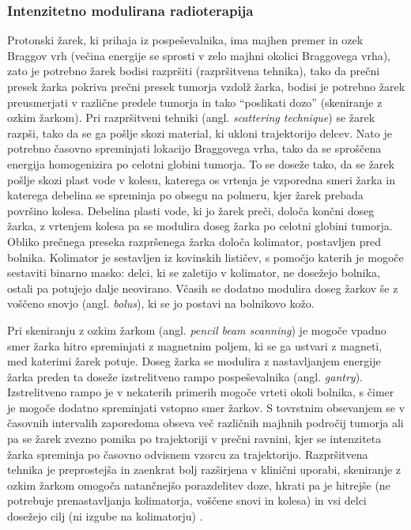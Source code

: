 \documentclass[a4paper,twoside,11pt]{article}
\begin{document}
	\subsubsection*{Intenzitetno modulirana radioterapija}
	\par{
	  Protonski žarek, ki prihaja iz pospeševalnika, ima majhen premer in ozek Braggov vrh (večina energije se sprosti v zelo majhni okolici Braggovega vrha), zato je potrebno žarek bodisi razpršiti (razpršitvena tehnika), tako da prečni presek žarka pokriva prečni presek tumorja vzdolž žarka, bodisi je potrebno žarek preusmerjati v različne predele tumorja in tako ``poslikati dozo'' (skeniranje z ozkim žarkom). Pri razpršitveni tehniki (angl. \emph{scattering technique}) se žarek razpši, tako da se ga pošlje skozi material, ki ukloni trajektorijo delcev. Nato je potrebno časovno spreminjati lokacijo Braggovega vrha, tako da se sproščena energija homogenizira po celotni globini tumorja. To se doseže tako, da se žarek pošlje skozi plast vode v kolesu, katerega os vrtenja je vzporedna smeri žarka in katerega debelina se spreminja po obsegu na polmeru, kjer žarek prebada površino kolesa. Debelina plasti vode, ki jo žarek preči, določa končni doseg žarka, z vrtenjem kolesa pa se modulira doseg žarka po celotni globini tumorja. Obliko prečnega preseka razpršenega žarka določa kolimator, postavljen pred bolnika. Kolimator je sestavljen iz kovinskih lističev, s pomočjo katerih je mogoče sestaviti binarno masko: delci, ki se zaletijo v kolimator, ne dosežejo bolnika, ostali pa potujejo dalje neovirano. Včasih se dodatno modulira doseg žarkov še z voščeno snovjo (angl. \emph{bolus}), ki se jo postavi na bolnikovo kožo.
	}
	\par{
	  Pri skeniranju z ozkim žarkom (angl. \emph{pencil beam scanning}) je mogoče vpadno smer žarka hitro spreminjati z magnetnim poljem, ki se ga ustvari z magneti, med katerimi žarek potuje. Doseg žarka se modulira z nastavljanjem energije žarka preden ta doseže izstrelitveno rampo pospeševalnika (angl. \emph{gantry}). Izstrelitveno rampo je v nekaterih primerih mogoče vrteti okoli bolnika, s čimer je mogoče dodatno spreminjati vstopno smer žarkov. S tovrstnim obsevanjem se v časovnih intervalih zaporedoma obseva več različnih majhnih področij tumorja ali pa se žarek zvezno pomika po trajektoriji v prečni ravnini, kjer se intenziteta žarka spreminja po časovno odvisnem vzorcu za trajektorijo. Razpršitvena tehnika je preprostejša in zaenkrat bolj razširjena v klinični uporabi, skeniranje z ozkim žarkom omogoča natančnejšo porazdelitev doze, hkrati pa je hitrejše (ne potrebuje prenastavljanja kolimatorja, voščene snovi in kolesa) in vsi delci dosežejo cilj (ni izgube na kolimatorju) \citep{schippers2011}.
	}
\end{document}
